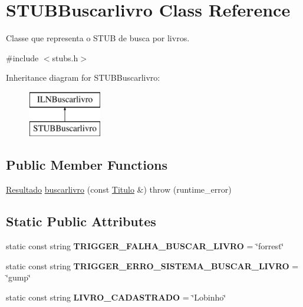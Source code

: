 \hypertarget{classSTUBBuscarlivro}{}\section{S\+T\+U\+B\+Buscarlivro Class Reference}
\label{classSTUBBuscarlivro}


Classe que representa o S\+T\+UB de busca por livros.  




{\ttfamily \#include $<$stubs.\+h$>$}

Inheritance diagram for S\+T\+U\+B\+Buscarlivro\+:\begin{figure}[H]
\begin{center}
\leavevmode
\includegraphics[height=2.000000cm]{classSTUBBuscarlivro}
\end{center}
\end{figure}
\subsection*{Public Member Functions}
\begin{DoxyCompactItemize}
\item 
\hyperlink{classResultado}{Resultado} \hyperlink{classSTUBBuscarlivro_accbcec2b22c7b768e488e96624d9a9d6}{buscarlivro} (const \hyperlink{classTitulo}{Titulo} \&)  throw (runtime\+\_\+error)
\end{DoxyCompactItemize}
\subsection*{Static Public Attributes}
\begin{DoxyCompactItemize}
\item 
\mbox{\label{classSTUBBuscarlivro_acd3cf870633a937703102409213a4f63}} 
static const string {\bfseries T\+R\+I\+G\+G\+E\+R\+\_\+\+F\+A\+L\+H\+A\+\_\+\+B\+U\+S\+C\+A\+R\+\_\+\+L\+I\+V\+RO} = \char`\"{}forrest\char`\"{}
\item 
\mbox{\label{classSTUBBuscarlivro_a6f8d3e3d50b130baeea5945e874b3bf3}} 
static const string {\bfseries T\+R\+I\+G\+G\+E\+R\+\_\+\+E\+R\+R\+O\+\_\+\+S\+I\+S\+T\+E\+M\+A\+\_\+\+B\+U\+S\+C\+A\+R\+\_\+\+L\+I\+V\+RO} = \char`\"{}gump\char`\"{}
\item 
\mbox{\label{classSTUBBuscarlivro_a45efb21c64109d5b6ac6a289c061d751}} 
static const string {\bfseries L\+I\+V\+R\+O\+\_\+\+C\+A\+D\+A\+S\+T\+R\+A\+DO} = \char`\"{}Lobinho\char`\"{}
\end{DoxyCompactItemize}


